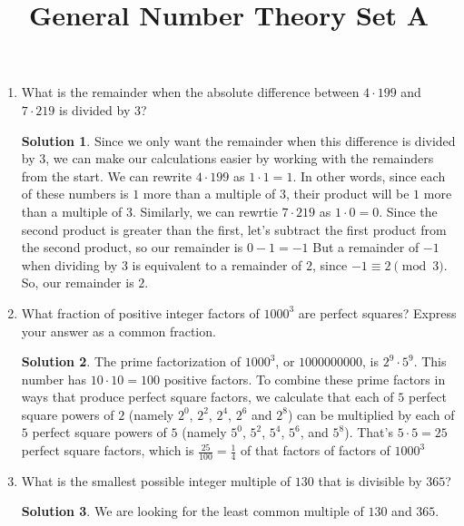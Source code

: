 \documentclass{article}
\title{General Number Theory Set A}
\date{}
\author{}
\theoremstyle{definition}
\newtheorem*{solution}{Solution}
\begin{document}
\maketitle
\begin{multicols}{2}
    \begin{enumerate}
        \item What is the remainder when the absolute difference between $4 \cdot 199$
        and $7 \cdot 219$ is divided by $3$?
        \begin{solution}
            Since we only want the remainder when this difference is divided by $3$,
            we can make our calculations easier by working with the remainders from the start.
            We can rewrite $4 \cdot 199$ as $1 \cdot 1 = 1$.
            In other words, since each of these numbers is $1$ more than a multiple of $3$,
            their product will be $1$ more than a multiple of $3$.
            Similarly, we can rewrtie $7 \cdot 219$ as $1 \cdot 0 = 0$.
            Since the second product is greater than the first, let's subtract the first product from the second product,
            so our remainder is $0 - 1 = -1$
            But a remainder of $-1$ when dividing by $3$ is equivalent to a remainder of $2$, since $-1 \equiv 2 \pmod{3}$.
            So, our remainder is $2$.
        \end{solution}
        \item What fraction of positive integer factors of $1000^3$ are perfect squares?
        Express your answer as a common fraction.
        \begin{solution}
            The prime factorization of $1000^3$, or $\num{1000000000}$, is $2^9 \cdot 5^9$.
            This number has $10 \cdot 10 = 100$ positive factors.
            To combine these prime factors in ways that produce perfect square factors,
            we calculate that each of $5$ perfect square powers of $2$ (namely $2^0$, $2^2$, $2^4$, $2^6$ and $2^8$)
            can be multiplied by each of $5$ perfect square powers of $5$ (namely $5^0$, $5^2$, $5^4$, $5^6$, and $5^8$).
            That's $5 \cdot 5 = 25$ perfect square factors, which is $\frac{25}{100} = \frac{1}{4}$ of that factors of factors of $1000^3$
        \end{solution}
        \item What is the smallest possible integer multiple of $130$ that is divisible by $365$?
        \begin{solution}
            We are looking for the least common multiple of $130$ and $365$.

\end{solution}
\end{enumerate}
\end{multicols}
\end{document}
